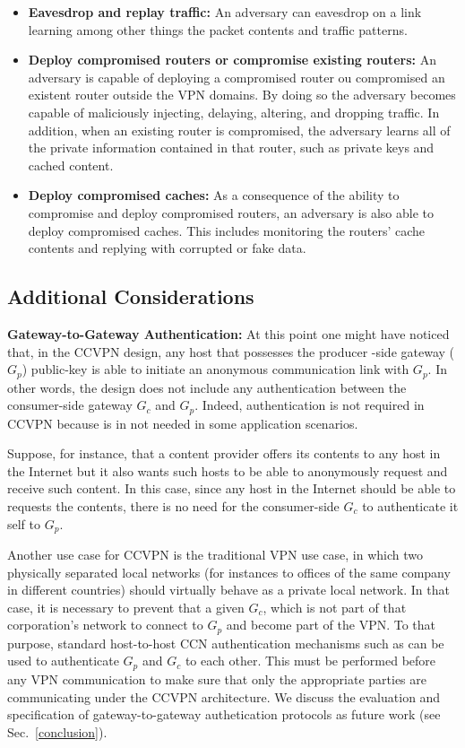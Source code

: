 \begin{itemize}
	\item \textbf{Eavesdrop and replay traffic:} An adversary can eavesdrop on a link learning among other things the packet contents and traffic patterns.
	\item \textbf{Deploy compromised routers or compromise existing routers:} An adversary is capable of deploying a compromised router ou compromised an existent router outside the VPN domains. By doing so the adversary becomes capable of maliciously injecting, delaying, altering, and dropping traffic. In addition, when an existing router is compromised, the adversary learns all of the private information contained in that router, such as private keys and cached content.
	\item \textbf{Deploy compromised caches:} As a consequence of the ability to compromise and deploy compromised routers, an adversary is also able to deploy compromised caches. This includes monitoring the routers' cache contents and replying with corrupted or fake data.
\end{itemize}

\subsection{Additional Considerations}

\textbf{Gateway-to-Gateway Authentication:} At this point one might have noticed that, in the CCVPN design, any host that possesses the producer -side gateway ($G_p$) public-key is able to initiate an anonymous communication link with $G_p$. In other words, the design does not include any authentication between the consumer-side gateway $G_c$ and $G_p$. Indeed, authentication is not required in CCVPN because is in not needed in some application scenarios.

Suppose, for instance, that a content provider offers its contents to any host in the Internet but it also  wants such hosts to be able to anonymously request and receive such content. In this case, since any host in the Internet should be able to requests the contents, there is no need for the consumer-side $G_c$ to authenticate it self to $G_p$.

Another use case for CCVPN is the traditional VPN use case, in which two physically separated local networks (for instances to offices of the same company in different countries) should virtually behave as a private local network. In that case, it is necessary to prevent that a given $G_c$, which is not part of that corporation's network to connect to $G_p$ and become part of the VPN. To that purpose, standard host-to-host CCN authentication mechanisms such as \cite{} can be used to authenticate $G_p$ and $G_c$ to each other. This must be performed before any VPN communication to make sure that only the appropriate parties are communicating under the CCVPN architecture. We discuss the evaluation and specification of gateway-to-gateway authetication protocols as future work (see Sec.~\ref{conclusion}).

